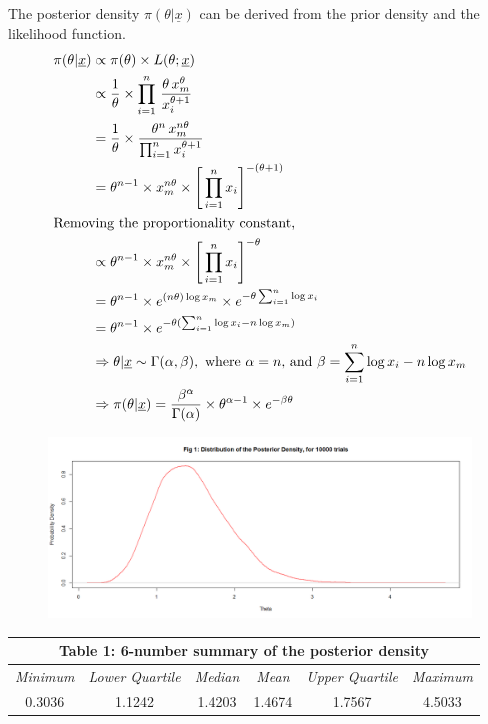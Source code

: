 \documentclass[11pt,a4paper]{article}
\renewcommand{\a}{\alpha}
\renewcommand{\b}{\beta}
\renewcommand{\th}{\theta}
\begin{document}
The posterior density $ \pi(\th | \underline x) $ can be derived from the prior density and the likelihood function. 
\begin{align*}
    \pi(\th | \underline x) &\propto \pi(\th) \times L(\th; \underline x) \\
                            &\propto \frac{1}{\th} \times \prod_{i=1}^n \, \frac{\theta \, x_m^\theta}{x_i^{\theta+1}} \\
                            &= \frac{1}{\th} \times \frac{\th^n \, x_m^{n\th}}{\prod_{i=1}^n x_i^{\th+1} } \\
                            &= \theta^{n-1} \times x_m^{n\th} \times \Bigg[ \prod_{i=1}^n x_i \Bigg]^{-(\th+1)} \\
                            \shortintertext{Removing the proportionality constant,}
                            &\propto \theta^{n-1} \times x_m^{n\th} \times \Bigg[ \prod_{i=1}^n x_i \Bigg]^{-\th} \\
                            &= \th^{n-1} \times e^{(n\th)\log x_m} \times e^{-\th\sum_{i=1}^n \log x_i} \\
                            &= \th^{n-1} \times e^{-\th(\sum_{i=1}^n\log x_i - n\log x_m)} \\
                            &\Rightarrow \th|\underline x \sim \Gamma(\a, \b), \text{ where } \a = n \text{, and } \b = \sum_{i=1}^n\log x_i - n\log x_m \\
                            &\Rightarrow \pi(\th|\underline{x}) = \frac{\b^\a}{\Gamma(\a)} \times \th^{\a-1} \times e^{-\b\th}
\end{align*}

\begin{figure}[!ht]
\includegraphics[width=\textwidth]{Q2_Graph_03.png}
\end{figure}
\begin{center}
{
    \setlength\extrarowheight{3pt}
    \noindent\begin{tabular}{|c c c c c c|}
        \hline
        \multicolumn{6}{|c|}{ \textbf{Table 1: 6-number summary of the posterior density} }\\
        \hline
        \textit{Minimum} & \textit{Lower Quartile} & \textit{Median} & \textit{Mean} & \textit{Upper Quartile} & \textit{Maximum} \\
        \hline
        0.3036 & 1.1242 & 1.4203 & 1.4674 & 1.7567 & 4.5033 \\
        \hline
    \end{tabular}
}
\end{center}
\end{document}
